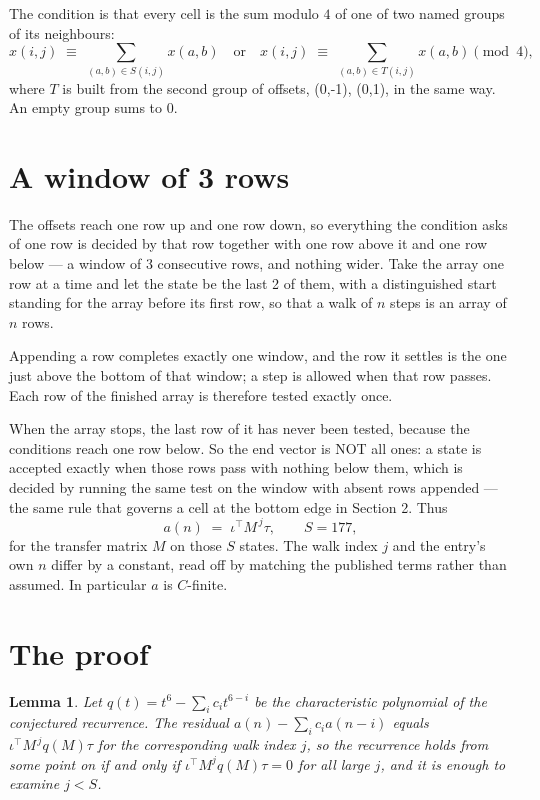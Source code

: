 \documentclass[11pt,a4paper]{article}
\theoremstyle{plain}
\newtheorem{lemma}[theorem]{Lemma}
\theoremstyle{definition}
\begin{document}
The condition is that every cell is the sum modulo $4$ of one of two named groups of its neighbours:
\[
x(i,j)\;\equiv\;\sum_{(a,b)\in S(i,j)}x(a,b) \quad\text{or}\quad x(i,j)\;\equiv\;\sum_{(a,b)\in T(i,j)}x(a,b) \pmod{4},
\]
where $T$ is built from the second group of offsets, (0,-1), (0,1), in the same way. An empty group sums to $0$.

\section{A window of 3 rows}

The offsets reach one row up and one row down, so everything the condition asks of one row is
decided by that row together with one row above it and one row below --- a window of
$3$ consecutive rows, and nothing wider. Take the array one row at a time
and let the state be the last 2 of them, with a distinguished start standing for the
array before its first row, so that a walk of $n$ steps is an array of $n$ rows.

Appending a row completes exactly one window, and the row it settles is the one just above the bottom of that window; a step is
allowed when that row passes. Each row of the finished
array is therefore tested exactly once.

When the array stops, the last row of it has never been tested, because the
conditions reach one row below. So the end vector is NOT all ones: a state is accepted exactly when
those rows pass with nothing below them, which is decided by running the same test on the window
with absent rows appended --- the same rule that governs a cell at the bottom edge in
Section 2.
Thus
\[
a(n)\;=\;\iota^{\!\top}M^{\,j}\tau ,\qquad S=177,
\]
for the transfer matrix $M$ on those $S$ states. The walk index $j$ and the entry's own $n$
differ by a constant, read off by matching the published terms rather than assumed. In
particular $a$ is $C$-finite.

\section{The proof}

\begin{lemma}\label{lem:crit}
Let $q(t)=t^{6}-\sum_i c_it^{6-i}$ be the characteristic polynomial of the
conjectured recurrence. The residual $a(n)-\sum_ic_ia(n-i)$ equals
$\iota^{\!\top}M^{\,j}q(M)\tau$ for the corresponding walk index $j$, so the recurrence
holds from some point on if and only if $\iota^{\!\top}M^{j}q(M)\tau=0$ for all large $j$,
and it is enough to examine $j<S$.
\end{lemma}
\end{document}
